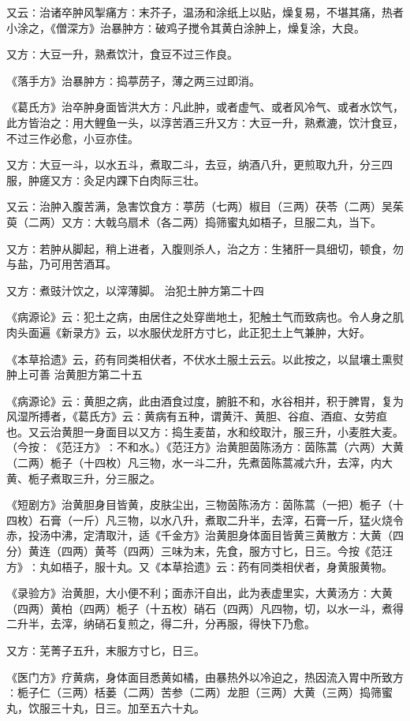 \documentclass[a4paper,12pt,UTF8,twoside]{ctexbook}
\begin{document}
又云∶治诸卒肿风掣痛方∶末芥子，温汤和涂纸上以贴，燥复易，不堪其痛，热者小涂之，《僧深方》治暴肿方∶破鸡子搅令其黄白涂肿上，燥复涂，大良。

又方∶大豆一升，熟煮饮汁，食豆不过三作良。

《落手方》治暴肿方∶捣葶苈子，薄之两三过即消。

《葛氏方》治卒肿身面皆洪大方∶凡此肿，或者虚气、或者风冷气、或者水饮气，此方皆治之∶用大鲤鱼一头，以淳苦酒三升又方∶大豆一升，熟煮漉，饮汁食豆，不过三作必愈，小豆亦佳。

又方∶大豆一斗，以水五斗，煮取二斗，去豆，纳酒八升，更煎取九升，分三四服，肿瘥又方∶灸足内踝下白肉际三壮。

又云∶治肿入腹苦满，急害饮食方∶葶苈（七两）椒目（三两）茯苓（二两）吴茱萸（二两）又方∶大戟乌扇术（各二两）捣筛蜜丸如梧子，旦服二丸，当下。

又方∶若肿从脚起，稍上进者，入腹则杀人，治之方∶生猪肝一具细切，顿食，勿与盐，乃可用苦酒耳。

又方∶煮豉汁饮之，以滓薄脚。
治犯土肿方第二十四

《病源论》云∶犯土之病，由居住之处穿凿地土，犯触土气而致病也。令人身之肌肉头面遍《新录方》云，以水服伏龙肝方寸匕，此正犯土上气兼肿，大好。

《本草拾遗》云，药有同类相伏者，不伏水土服土云云。以此按之，以鼠壤土熏熨肿上可善
治黄胆方第二十五

《病源论》云∶黄胆之病，此由酒食过度，腑脏不和，水谷相并，积于脾胃，复为风湿所搏者，《葛氏方》云∶黄病有五种，谓黄汗、黄胆、谷疸、酒疸、女劳疸也。又云治黄胆一身面目以又方∶捣生麦苗，水和绞取汁，服三升，小麦胜大麦。（今按∶《范汪方》∶不和水。）《范汪方》治黄胆茵陈汤方∶茵陈蒿（六两）大黄（二两）栀子（十四枚）凡三物，水一斗二升，先煮茵陈蒿减六升，去滓，内大黄、栀子煮取三升，分三服之。

《短剧方》治黄胆身目皆黄，皮肤尘出，三物茵陈汤方∶茵陈蒿（一把）栀子（十四枚）石膏（一斤）凡三物，以水八升，煮取二升半，去滓，石膏一斤，猛火烧令赤，投汤中沸，定清取汁，适《千金方》治黄胆身体面目皆黄三黄散方∶大黄（四分）黄连（四两）黄芩（四两）三味为末，先食，服方寸匕，日三。今按《范汪方》∶丸如梧子，服十丸。又《本草拾遗》云∶药有同类相伏者，身黄服黄物。

《录验方》治黄胆，大小便不利；面赤汗自出，此为表虚里实，大黄汤方∶大黄（四两）黄柏（四两）栀子（十五枚）硝石（四两）凡四物，切，以水一斗，煮得二升半，去滓，纳硝石复煎之，得二升，分再服，得快下乃愈。

又方∶芜菁子五升，末服方寸匕，日三。

《医门方》疗黄病，身体面目悉黄如橘，由暴热外以冷迫之，热因流入胃中所致方∶栀子仁（三两）栝蒌（二两）苦参（二两）龙胆（三两）大黄（三两）捣筛蜜丸，饮服三十丸，日三。加至五六十丸。
\end{document}
